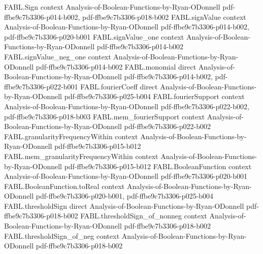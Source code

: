 \begin{theorem}
\label{FABL.expect_agreeingVoteCount}
\leanok
{}
\proofstep
  {FABL.Sign}
  {context}
  {Analysis-of-Boolean-Functions-by-Ryan-ODonnell}
  {pdf-ffbe9c7b3306-p014-b002,
    pdf-ffbe9c7b3306-p018-b002}
\proofstep
  {FABL.signValue}
  {context}
  {Analysis-of-Boolean-Functions-by-Ryan-ODonnell}
  {pdf-ffbe9c7b3306-p014-b002,
    pdf-ffbe9c7b3306-p020-b001}
\proofstep
  {FABL.signValue_one}
  {context}
  {Analysis-of-Boolean-Functions-by-Ryan-ODonnell}
  {pdf-ffbe9c7b3306-p014-b002}
\proofstep
  {FABL.signValue_neg_one}
  {context}
  {Analysis-of-Boolean-Functions-by-Ryan-ODonnell}
  {pdf-ffbe9c7b3306-p014-b002}
\proofstep
  {FABL.monomial}
  {direct}
  {Analysis-of-Boolean-Functions-by-Ryan-ODonnell}
  {pdf-ffbe9c7b3306-p014-b002,
    pdf-ffbe9c7b3306-p022-b001}
\proofstep
  {FABL.fourierCoeff}
  {direct}
  {Analysis-of-Boolean-Functions-by-Ryan-ODonnell}
  {pdf-ffbe9c7b3306-p025-b004}
\proofstep
  {FABL.fourierSupport}
  {context}
  {Analysis-of-Boolean-Functions-by-Ryan-ODonnell}
  {pdf-ffbe9c7b3306-p022-b002,
    pdf-ffbe9c7b3306-p018-b003}
\proofstep
  {FABL.mem_fourierSupport}
  {context}
  {Analysis-of-Boolean-Functions-by-Ryan-ODonnell}
  {pdf-ffbe9c7b3306-p022-b002}
\proofstep
  {FABL.granularityFrequencyWithin}
  {context}
  {Analysis-of-Boolean-Functions-by-Ryan-ODonnell}
  {pdf-ffbe9c7b3306-p015-b012}
\proofstep
  {FABL.mem_granularityFrequencyWithin}
  {context}
  {Analysis-of-Boolean-Functions-by-Ryan-ODonnell}
  {pdf-ffbe9c7b3306-p015-b012}
\proofstep
  {FABL.BooleanFunction}
  {context}
  {Analysis-of-Boolean-Functions-by-Ryan-ODonnell}
  {pdf-ffbe9c7b3306-p020-b001}
\proofstep
  {FABL.BooleanFunction.toReal}
  {context}
  {Analysis-of-Boolean-Functions-by-Ryan-ODonnell}
  {pdf-ffbe9c7b3306-p020-b001,
    pdf-ffbe9c7b3306-p025-b004}
\proofstep
  {FABL.thresholdSign}
  {direct}
  {Analysis-of-Boolean-Functions-by-Ryan-ODonnell}
  {pdf-ffbe9c7b3306-p018-b002}
\proofstep
  {FABL.thresholdSign_of_nonneg}
  {context}
  {Analysis-of-Boolean-Functions-by-Ryan-ODonnell}
  {pdf-ffbe9c7b3306-p018-b002}
\proofstep
  {FABL.thresholdSign_of_neg}
  {context}
  {Analysis-of-Boolean-Functions-by-Ryan-ODonnell}
  {pdf-ffbe9c7b3306-p018-b002}
\proofstep

\end{theorem}
